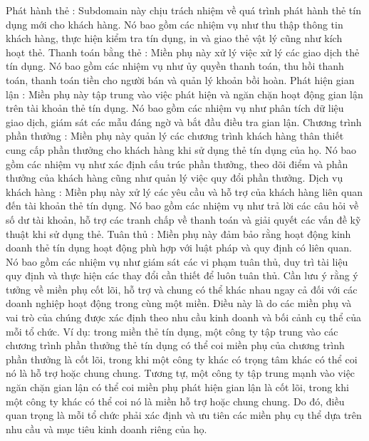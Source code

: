 Phát hành thẻ : Subdomain này chịu trách nhiệm về quá trình phát hành thẻ tín dụng mới cho khách hàng. Nó bao gồm các nhiệm vụ như thu thập thông tin khách hàng, thực hiện kiểm tra tín dụng, in và giao thẻ vật lý cũng như kích hoạt thẻ.
Thanh toán bằng thẻ : Miền phụ này xử lý việc xử lý các giao dịch thẻ tín dụng. Nó bao gồm các nhiệm vụ như ủy quyền thanh toán, thu hồi thanh toán, thanh toán tiền cho người bán và quản lý khoản bồi hoàn.
Phát hiện gian lận : Miền phụ này tập trung vào việc phát hiện và ngăn chặn hoạt động gian lận trên tài khoản thẻ tín dụng. Nó bao gồm các nhiệm vụ như phân tích dữ liệu giao dịch, giám sát các mẫu đáng ngờ và bắt đầu điều tra gian lận.
Chương trình phần thưởng : Miền phụ này quản lý các chương trình khách hàng thân thiết cung cấp phần thưởng cho khách hàng khi sử dụng thẻ tín dụng của họ. Nó bao gồm các nhiệm vụ như xác định cấu trúc phần thưởng, theo dõi điểm và phần thưởng của khách hàng cũng như quản lý việc quy đổi phần thưởng.
Dịch vụ khách hàng : Miền phụ này xử lý các yêu cầu và hỗ trợ của khách hàng liên quan đến tài khoản thẻ tín dụng. Nó bao gồm các nhiệm vụ như trả lời các câu hỏi về số dư tài khoản, hỗ trợ các tranh chấp về thanh toán và giải quyết các vấn đề kỹ thuật khi sử dụng thẻ.
Tuân thủ : Miền phụ này đảm bảo rằng hoạt động kinh doanh thẻ tín dụng hoạt động phù hợp với luật pháp và quy định có liên quan. Nó bao gồm các nhiệm vụ như giám sát các vi phạm tuân thủ, duy trì tài liệu quy định và thực hiện các thay đổi cần thiết để luôn tuân thủ.
Cần lưu ý rằng ý tưởng về miền phụ cốt lõi, hỗ trợ và chung có thể khác nhau ngay cả đối với các doanh nghiệp hoạt động trong cùng một miền. Điều này là do các miền phụ và vai trò của chúng được xác định theo nhu cầu kinh doanh và bối cảnh cụ thể của mỗi tổ chức. Ví dụ: trong miền thẻ tín dụng, một công ty tập trung vào các chương trình phần thưởng thẻ tín dụng có thể coi miền phụ của chương trình phần thưởng là cốt lõi, trong khi một công ty khác có trọng tâm khác có thể coi nó là hỗ trợ hoặc chung chung. Tương tự, một công ty tập trung mạnh vào việc ngăn chặn gian lận có thể coi miền phụ phát hiện gian lận là cốt lõi, trong khi một công ty khác có thể coi nó là miền hỗ trợ hoặc chung chung. Do đó, điều quan trọng là mỗi tổ chức phải xác định và ưu tiên các miền phụ cụ thể dựa trên nhu cầu và mục tiêu kinh doanh riêng của họ.


